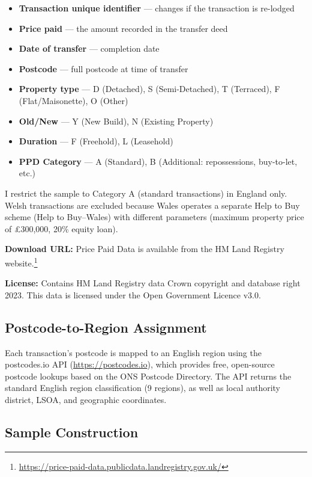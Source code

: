\documentclass[12pt]{article}
\begin{document}
\begin{itemize}
\item \textbf{Transaction unique identifier} --- changes if the transaction is re-lodged
\item \textbf{Price paid} --- the amount recorded in the transfer deed
\item \textbf{Date of transfer} --- completion date
\item \textbf{Postcode} --- full postcode at time of transfer
\item \textbf{Property type} --- D (Detached), S (Semi-Detached), T (Terraced), F (Flat/Maisonette), O (Other)
\item \textbf{Old/New} --- Y (New Build), N (Existing Property)
\item \textbf{Duration} --- F (Freehold), L (Leasehold)
\item \textbf{PPD Category} --- A (Standard), B (Additional: repossessions, buy-to-let, etc.)
\end{itemize}

I restrict the sample to Category A (standard transactions) in England only. Welsh transactions are excluded because Wales operates a separate Help to Buy scheme (Help to Buy--Wales) with different parameters (maximum property price of \pounds300,000, 20\% equity loan).

\textbf{Download URL:} Price Paid Data is available from the HM Land Registry website.\footnote{\url{https://price-paid-data.publicdata.landregistry.gov.uk/}}

\textbf{License:} Contains HM Land Registry data \textcopyright{} Crown copyright and database right 2023. This data is licensed under the Open Government Licence v3.0.

\subsection{Postcode-to-Region Assignment}

Each transaction's postcode is mapped to an English region using the postcodes.io API (\url{https://postcodes.io}), which provides free, open-source postcode lookups based on the ONS Postcode Directory. The API returns the standard English region classification (9 regions), as well as local authority district, LSOA, and geographic coordinates.

\subsection{Sample Construction}
\end{document}
